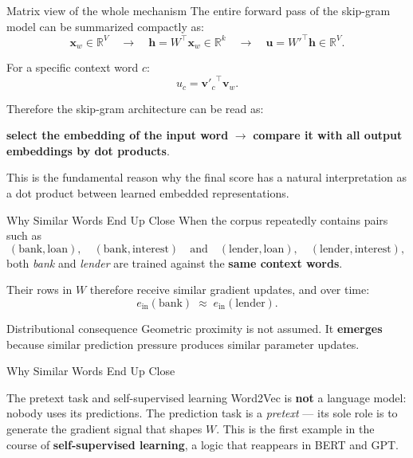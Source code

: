 \documentclass[11pt,aspectratio=169,professionalfonts]{beamer}
\begin{document}
%
%
\begin{frame}{Matrix view of the whole mechanism}
The entire forward pass of the skip-gram model can be summarized compactly as:
\[
\bm{x}_w \in \mathbb{R}^{V}
\quad \longrightarrow \quad
\bm{h} = W^\top \bm{x}_w \in \mathbb{R}^{k}
\quad \longrightarrow \quad
\bm{u} = W'^\top \bm{h} \in \mathbb{R}^{V}.
\]

For a specific context word $c$:
\[
u_c = {\bm{v}'_c}^\top \bm{v}_w.
\]

\vspace{0.3cm}

Therefore the skip-gram architecture can be read as:
\begin{center}
\textbf{select the embedding of the input word} $\rightarrow$ \textbf{compare it with all output embeddings by dot products}.
\end{center}

\vspace{0.3cm}

This is the fundamental reason why the final score has a natural interpretation as a dot product between learned embedded representations.
\end{frame}
%
%
\begin{frame}{Why Similar Words End Up Close}
When the corpus repeatedly contains pairs such as
\[
(\text{bank},\text{loan}),\quad(\text{bank},\text{interest})
\quad\text{and}\quad
(\text{lender},\text{loan}),\quad(\text{lender},\text{interest}),
\]
both \textit{bank} and \textit{lender} are trained against the \textbf{same context words}.

\vspace{0.15cm}
Their rows in $W$ therefore receive similar gradient updates, and over time:
\[
e_{\text{in}}(\text{bank}) \;\approx\; e_{\text{in}}(\text{lender}).
\]

\begin{block}{Distributional consequence}
Geometric proximity is not assumed. It \textbf{emerges} because similar prediction pressure produces similar parameter updates.
\end{block}
\end{frame}
%
%
\begin{frame}{Why Similar Words End Up Close}
\begin{alertblock}{The pretext task and self-supervised learning}
Word2Vec is \textbf{not} a language model: nobody uses its predictions.
The prediction task is a \emph{pretext} --- its sole role is to generate the gradient signal that shapes $W$.
This is the first example in the course of \textbf{self-supervised learning}, a logic that reappears in BERT and GPT.
\end{alertblock}
\end{frame}
%
\end{document}
